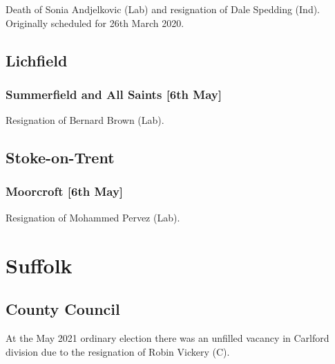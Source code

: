 \documentclass[a4paper,openany]{book}
\begin{document}
\begin{resultsiii}

Death of Sonia Andjelkovic (Lab) and resignation of Dale Spedding (Ind).  Originally scheduled for 26th March 2020.

\subsection*{Lichfield}

\subsubsection*{Summerfield and All Saints \hspace*{\fill}\nolinebreak[1]%
	\enspace\hspace*{\fill}
	[6th May]}


Resignation of Bernard Brown (Lab).

\subsection*{Stoke-on-Trent}

\subsubsection*{Moorcroft \hspace*{\fill}\nolinebreak[1]%
	\enspace\hspace*{\fill}
	[6th May]}


Resignation of Mohammed Pervez (Lab).

\section{Suffolk}

\subsection*{County Council}

At the May 2021 ordinary election there was an unfilled vacancy in Carlford division due to the resignation of Robin Vickery (C).


\end{resultsiii}
\end{document}
